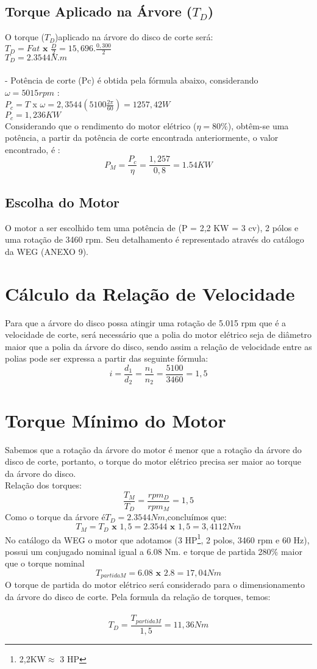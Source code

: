 \documentclass[a4paper, 11pt]{article}
\begin{document}
\subsection{Torque Aplicado na \'Arvore ($T_D$)}
O torque ($T_D$)aplicado na árvore do disco de corte será:\\
$T_D= Fat \textbf{ x } \frac{D}{2} = 15,696 . \frac{0,300}{2}$\\
$T_D = 2.3544 N.m$\\\\
- Pot\^encia de corte (Pc) \'e obtida pela f\'ormula abaixo, considerando\\
$\omega=5015 rpm$ :\\
$P_c = T$ x $\omega=2,3544(5100 \frac{2\pi}{60})=1257,42W $\\
$P_c=1,236KW$\\
Considerando que o rendimento do motor elétrico ($\eta = 80\%$), obt\^em-se
uma pot\^encia, a partir da pot\^encia de corte encontrada anteriormente, o valor
encontrado, \'e :\\
$$P_M=\frac{P_c}{\eta}=\frac{1,257}{0,8}=1.54KW$$
\subsection{Escolha do Motor}
O motor a ser escolhido tem uma potência de (P = 2,2 KW = 3 cv), 2 p\'olos e
uma rota\c{c}\~ao de 3460 rpm. Seu detalhamento \'e representado atrav\'es do cat\'alogo
da WEG (ANEXO 9).\\
\section{C\'alculo da Rela\c{c}\~ao de Velocidade}
Para que a \'arvore do disco possa atingir uma rota\c{c}\~ao de 5.015 rpm que
\'e a velocidade de corte, ser\'a necess\'ario que a polia do motor el\'etrico seja de
di\^ametro maior que a polia da \'arvore do disco, sendo assim a rela\c{c}\~ao de
velocidade entre as polias pode ser expressa a partir das seguinte f\'ormula:\\
$$i=\frac{d_1}{d_2}=\frac{n_1}{n_2}=\frac{5100}{3460}=1,5$$
\section{Torque M\'inimo do Motor}
Sabemos que a rotação da \'arvore do motor \'e menor que a rota\c{c}\~ao da
\'arvore do disco de corte, portanto, o torque do motor el\'etrico precisa ser maior
ao torque da \'arvore do disco.\\
Rela\c{c}\~ao dos torques:\\
$$\frac{T_M}{T_D}=\frac{rpm_D}{rpm_M}=1,5$$
Como o torque da \'arvore \'e$T_D=2.3544Nm$,conclu\'imos que:\
$$T_M=T_D\textbf{ x }1,5=2.3544\textbf{ x }1,5=3,4112Nm$$
No cat\'alogo da WEG o motor que adotamos (3 HP\footnote{2,2KW$\approx$ 3 HP }, 2 polos, 3460 rpm e 60 Hz), possui um conjugado nominal igual a 6.08 Nm. e torque de partida 280$\%$ maior que o torque nominal
$$T_{partida M}=6.08\textbf{ x }2.8=17,04Nm$$
O torque de partida do motor el\'etrico ser\'a considerado para o
dimensionamento da \'arvore do disco de corte. Pela formula da rela\c{c}\~ao de torques,
temos:\\
\\
$$T_D=\frac{T_{partida M}}{1,5}=11,36Nm$$
\end{document}
